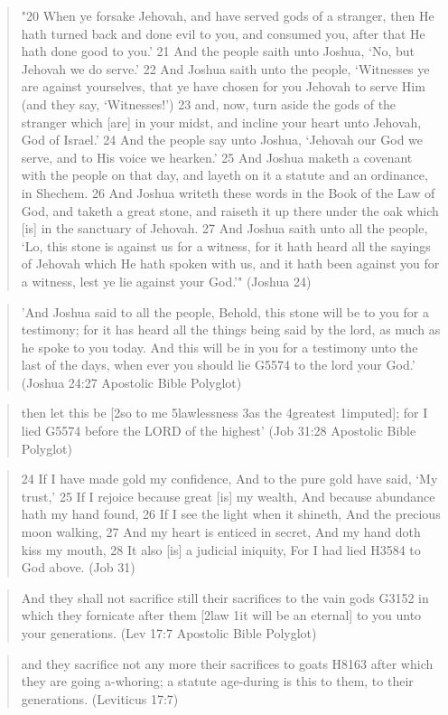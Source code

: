 \documentclass[11pt]{article}
\begin{document}
\begin{quote}
"20 When ye forsake Jehovah, and have served gods of a stranger, then He hath turned back and done evil to you, and consumed you, after that He hath done good to you.'
21 And the people saith unto Joshua, `No, but Jehovah we do serve.'
22 And Joshua saith unto the people, `Witnesses ye are against yourselves, that ye have chosen for you Jehovah to serve Him (and they say, `Witnesses!')
23 and, now, turn aside the gods of the stranger which [are] in your midst, and incline your heart unto Jehovah, God of Israel.'
24 And the people say unto Joshua, `Jehovah our God we serve, and to His voice we hearken.'
25 And Joshua maketh a covenant with the people on that day, and layeth on it a statute and an ordinance, in Shechem.
26 And Joshua writeth these words in the Book of the Law of God, and taketh a great stone, and raiseth it up there under the oak which [is] in the sanctuary of Jehovah.
27 And Joshua saith unto all the people, `Lo, this stone is against us for a witness, for it hath heard all the sayings of Jehovah which He hath spoken with us, and it hath been against you for a witness, lest ye lie against your God.'" (Joshua 24)
\end{quote}
\begin{quote}
'And Joshua said to all the people, Behold, this stone will be to you for a testimony; for it has heard all the things being said by the lord, as much as he spoke to you today. And this will be in you for a testimony unto the last of the days, when ever you should lie G5574 to the lord your God.' (Joshua 24:27 Apostolic Bible Polyglot)
\end{quote}
\begin{quote}
then let this be [2so to me 5lawlessness 3as the 4greatest 1imputed]; for I lied G5574 before the LORD of the highest'
(Job 31:28 Apostolic Bible Polyglot)
\end{quote}
\begin{quote}
24 If I have made gold my confidence, And to the pure gold have said, `My trust,'
25 If I rejoice because great [is] my wealth, And because abundance hath my hand found,
26 If I see the light when it shineth, And the precious moon walking,
27 And my heart is enticed in secret, And my hand doth kiss my mouth,
28 It also [is] a judicial iniquity, For I had lied H3584 to God above.
(Job 31)
\end{quote}


\begin{quote}
And they shall not sacrifice still their sacrifices to the vain gods G3152 in which they fornicate after them [2law 1it will be an eternal] to you unto your generations. (Lev 17:7 Apostolic Bible Polyglot)
\end{quote}
\begin{quote}
and they sacrifice not any more their sacrifices to goats H8163 after which they are going a-whoring; a statute age-during is this to them, to their generations. (Leviticus 17:7)
\end{quote}
\end{document}
